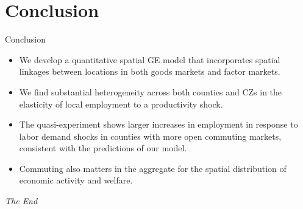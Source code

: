\documentclass{beamer}
\begin{document}
\section{Conclusion}
\begin{frame}[shrink]
	\transfade %
	\tableofcontents[sectionstyle=show/shaded,subsectionstyle=show/shaded/hide]
	\addtocounter{framenumber}{-1}
\end{frame}
\begin{frame}{Conclusion}
	\begin{itemize}
		\item We develop a quantitative spatial GE model that incorporates spatial linkages between locations in both goods markets and factor markets.
		\item We find substantial heterogeneity across both counties and CZs in the elasticity of local employment to a productivity shock.
		\item The quasi-experiment shows larger increases in employment in response to labor demand shocks in counties with more open commuting markets, consistent with the predictions of our model.
		\item Commuting also matters in the aggregate for the spatial distribution of economic activity and welfare.
	\end{itemize}
\end{frame}
\begin{frame}
	\Huge{\centerline{\textit{The End}}}
\end{frame}
\end{document}
